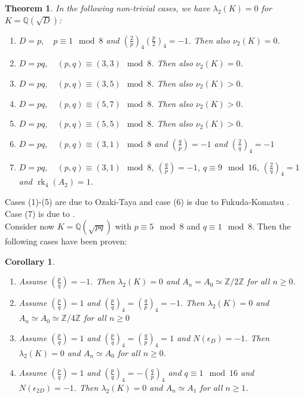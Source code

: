 \documentclass{article}
\numberwithin{equation}{section}
\theoremstyle{plain}  %
\newtheorem{theorem}{Theorem}[section]
\newtheorem{corollary}{Corollary}[section]
\theoremstyle{definition}
\newcommand{\Z}{\mathbb{Z}}
\newcommand{\Q}{\mathbb{Q}}
\newcommand{\paren}[1]{\left( #1 \right)}
\newcommand{\kron}[2]{\left( \tfrac{#1}{#2} \right)}
\DeclareMathOperator{\rk}{rk}
\begin{document}
\begin{theorem}
    In the following non-trivial cases, we have $\lambda_2(K)=0$ for $K=\Q(\sqrt{D})$:

    \begin{enumerate}[(1)]
        \item $D=p, \quad p \equiv 1\mod 8$ and $\paren{ \frac{2}{p}}_4 \paren{\frac{p}{2}}_4 =-1$. Then also $\nu_2(K)=0$.
        \item $D=pq, \quad (p,q)\equiv (3,3) \mod 8$. Then also $\nu_2(K)=0$.
        \item $D=pq, \quad (p,q)\equiv (3,5) \mod 8$. Then also $\nu_2(K)>0$.
        \item $D=pq, \quad (p,q)\equiv (5,7) \mod 8$. Then also $\nu_2(K)>0$.
        \item $D=pq, \quad (p,q)\equiv (5,5) \mod 8$. Then also $\nu_2(K)>0$.
        \item $D=pq, \quad (p,q)\equiv (3,1) \mod 8$ and $\paren{\frac{q}{p}}=-1$ and $\kron{2}{q}_4 =-1$
        \item $D=pq, \quad (p,q)\equiv (3,1) \mod 8$, $\paren{\frac{q}{p}}=-1$, $q\equiv 9 \mod 16$, $\paren{\frac{2}{q}}_4=1$ and $\rk_4(A_2)=1$. 
    \end{enumerate}
\end{theorem}
Cases (1)-(5) are due to Ozaki-Taya \cite{MR1484637} and case (6) is due to Fukuda-Komatsu \cite{MR2149635}. Case (7) is due to \cite{MR4262274}.\\

Consider now $K=\Q(\sqrt{pq})$ with $p\equiv 5\mod 8$ and $q\equiv 1 \mod 8$. Then the following cases have been proven: \cite[Cor~ 3.3.3]{MR4879114}

\begin{corollary}
\begin{enumerate}
    \item Assume $\paren{\frac{p}{q}}=-1$. Then $\lambda_2(K)=0$ and $A_n=A_0\simeq \Z/2\Z$ for all $n\geq 0$.
    \item Assume $\paren{\frac{p}{q}}=1$ and $\paren{\frac{p}{q}}_4=\paren{\frac{q}{p}}_4=-1.$ Then $\lambda_2(K)=0$ and $A_n\simeq A_0 \simeq \Z / 4 \Z$ for all $n\geq 0$
    \item Assume $\paren{\frac{p}{q}}=1$ and $\paren{\frac{p}{q}}_4=\paren{\frac{q}{p}}_4=1$ and $N(\epsilon_{D})=-1$. Then $\lambda_2(K)=0$ and $A_n \simeq A_0$ for all $n\geq 0$.
    \item Assume $\paren{\frac{p}{q}}=1$ and $\paren{\frac{p}{q}}_4=-\paren{\frac{q}{p}}_4$ and $q\equiv 1 \mod 16$ and $N(\epsilon_{2D})=-1$. Then $\lambda_2(K)=0$ and $A_n\simeq A_1$ for all $n\geq 1$.
     
\end{enumerate}
\end{corollary}
\end{document}
